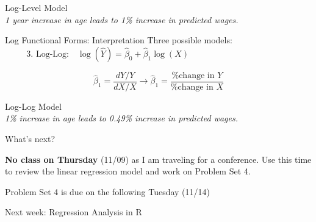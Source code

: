 \documentclass{./../div_teaching_slides}
\begin{document}
\begin{frame}{Log-Level Model}
\centering \small \vspace{-0.5em}
 \\ \vspace{1.5em}
\normalsize \textit{1 year increase in age leads to 1\% increase in predicted wages.} 
\end{frame}

\begin{frame}{Log Functional Forms: Interpretation}
Three possible models:
$$\text{3. Log-Log:} \quad \log(\hat{Y}) = \hat{\beta}_0 +  \hat{\beta}_1 \log(X) \hspace{5cm}$$

$$\hat{\beta}_1 = \frac{dY/Y}{dX/X} \rightarrow \hat{\beta}_1 = \frac{\text{\% change in $Y$}}{\text{\% change in $X$}}  $$
\end{frame}

\begin{frame}{Log-Log Model}
\centering \small \vspace{-0.5em}
 \\ \vspace{1.5em}
\normalsize \textit{1\% increase in age leads to 0.49\% increase in predicted wages.} 
\end{frame}


\begin{frame}{What's next?}
\begin{witemize}
  \item \textbf{No class on Thursday} (11/09) as I am traveling for a conference. Use this time to review the linear regression model and work on Problem Set 4.
  \item Problem Set 4 is due on the following Tuesday (11/14)
  \item Next week: Regression Analysis in R 
\end{witemize}
\end{frame}
\end{document}
